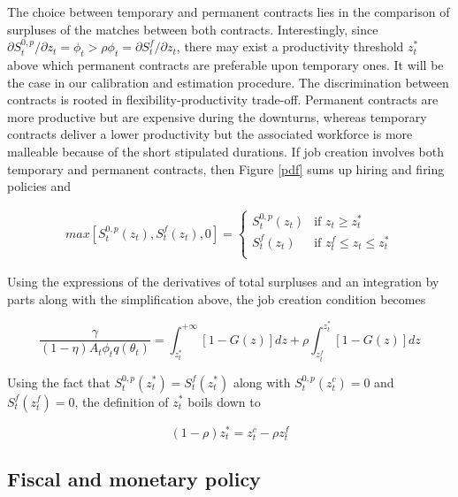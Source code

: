 \documentclass[a4paper]{article}
\begin{document}
The choice between temporary and permanent contracts lies in the comparison of surpluses of the matches between both contracts. Interestingly, since $\partial S_t^{0,p} / \partial z_t = \phi_t > \rho \phi_t = \partial S_t^{f} / \partial z_t$, there may exist a productivity threshold $z_t^*$ above which permanent contracts are preferable upon temporary ones. It will be the case in our calibration and estimation procedure. The discrimination between contracts is rooted in flexibility-productivity trade-off. Permanent contracts are more productive but are expensive during the downturns, whereas temporary contracts deliver a lower productivity but the associated workforce is more malleable because of the short stipulated durations. If job creation involves both temporary and permanent contracts, then Figure \ref{pdf} sums up hiring and firing policies and

\begin{align*}
max \left[ S_t^{0,p} \left( z_t \right) , S_t^{f} \left( z_t \right), 0\right] = \left\{
\begin{array}{ll}
S_t^{0,p} \left( z_t \right) & \text{if } z_t \geq z_t^*\\
S_t^{f} \left( z_t \right) & \text{if } z_t^f \leq z_t \leq z_t^*\\
\end{array}
\right.
\end{align*}

Using the expressions of the derivatives of total surpluses and an integration by parts along with the simplification above, the job creation condition becomes

\begin{equation}
\frac{\gamma}{(1-\eta) A_t \phi_t q\left( \theta_t \right)} = \int_{z_t^*}^{+\infty} \left[ 1 - G(z) \right] dz + \rho \int_{z_t^f}^{z_t^*} \left[ 1 - G(z) \right] dz \label{jc}
\end{equation}

Using the fact that $S_t^{0,p} \left( z_t^* \right) = S_t^{f} \left( z_t^* \right)$ along with $S_t^{0,p} \left( z_t^c \right) = 0$ and $S_t^{f} \left( z_t^f \right) = 0$, the definition of $z_t^*$ boils down to

\begin{equation}
(1-\rho) z_t^* = z_t^c - \rho z_t^f \label{def_zs}
\end{equation}

\subsection{Fiscal and monetary policy}
\end{document}

